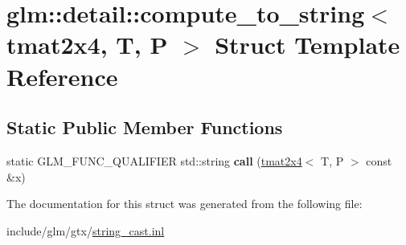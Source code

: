 \hypertarget{structglm_1_1detail_1_1compute__to__string_3_01tmat2x4_00_01T_00_01P_01_4}{}\section{glm\+:\+:detail\+:\+:compute\+\_\+to\+\_\+string$<$ tmat2x4, T, P $>$ Struct Template Reference}
\label{structglm_1_1detail_1_1compute__to__string_3_01tmat2x4_00_01T_00_01P_01_4}
\subsection*{Static Public Member Functions}
\begin{DoxyCompactItemize}
\item 
\mbox{\label{structglm_1_1detail_1_1compute__to__string_3_01tmat2x4_00_01T_00_01P_01_4_a4db0bd22adda3c7b7cb7e697aefe0a76}} 
static G\+L\+M\+\_\+\+F\+U\+N\+C\+\_\+\+Q\+U\+A\+L\+I\+F\+I\+ER std\+::string {\bfseries call} (\hyperlink{structglm_1_1tmat2x4}{tmat2x4}$<$ T, P $>$ const \&x)
\end{DoxyCompactItemize}


The documentation for this struct was generated from the following file\+:\begin{DoxyCompactItemize}
\item 
include/glm/gtx/\hyperlink{string__cast_8inl}{string\+\_\+cast.\+inl}\end{DoxyCompactItemize}
